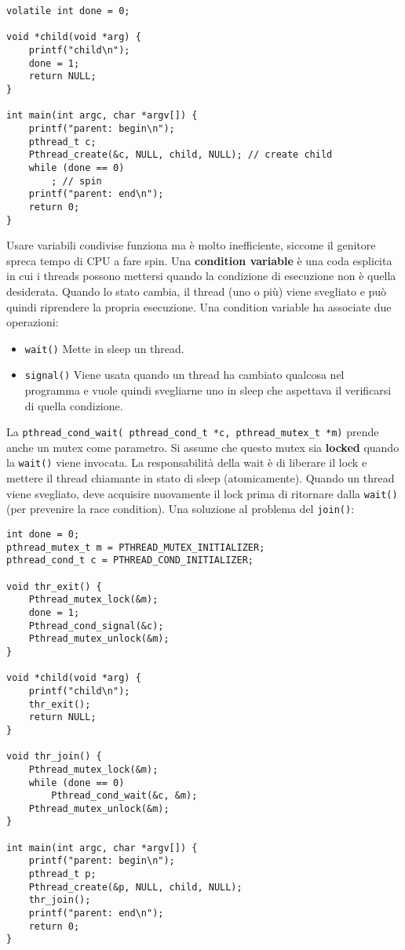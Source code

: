 \documentclass[12pt, letterpaper]{article}
\begin{document}
			\begin{lstlisting}[style=CStyle]
volatile int done = 0;

void *child(void *arg) {
	printf("child\n");
	done = 1;
	return NULL;
}

int main(int argc, char *argv[]) {
	printf("parent: begin\n");
	pthread_t c;
	Pthread_create(&c, NULL, child, NULL); // create child
	while (done == 0)
		; // spin
	printf("parent: end\n");
	return 0;
}			\end{lstlisting}
			Usare variabili condivise funziona ma è molto inefficiente, siccome il genitore spreca tempo di CPU a fare spin. Una \textbf{condition variable} è una coda esplicita in cui i threads possono mettersi quando la condizione di esecuzione non è quella desiderata. Quando lo stato cambia, il thread (uno o più) viene svegliato e può quindi riprendere la propria esecuzione.
			Una condition variable ha associate due operazioni: 
			\begin{itemize}
				\item \texttt{wait()} Mette in sleep un thread.
				\item \texttt{signal()} Viene usata quando un thread ha cambiato qualcosa nel programma e vuole quindi svegliarne uno in sleep che aspettava il verificarsi di quella condizione. 
			\end{itemize}
			La \texttt{pthread\_cond\_wait( pthread\_cond\_t *c, pthread\_mutex\_t *m)} prende anche un mutex come parametro. Si assume che questo mutex sia \textbf{locked} quando la \texttt{wait()} viene invocata. La responsabilità della wait è di liberare il lock e mettere il thread chiamante in stato di sleep (atomicamente). Quando un thread viene svegliato, deve acquisire nuovamente il lock prima di ritornare dalla \texttt{wait()} (per prevenire la race condition). Una soluzione al problema del \texttt{join()}:
			\begin{lstlisting}[style=CStyle]
int done = 0;
pthread_mutex_t m = PTHREAD_MUTEX_INITIALIZER;
pthread_cond_t c = PTHREAD_COND_INITIALIZER;

void thr_exit() {
	Pthread_mutex_lock(&m);
	done = 1;
	Pthread_cond_signal(&c);
	Pthread_mutex_unlock(&m);
}

void *child(void *arg) {
	printf("child\n");
	thr_exit();
	return NULL;
}

void thr_join() {
	Pthread_mutex_lock(&m);
	while (done == 0)
		Pthread_cond_wait(&c, &m);
	Pthread_mutex_unlock(&m);
}

int main(int argc, char *argv[]) {
	printf("parent: begin\n");
	pthread_t p;
	Pthread_create(&p, NULL, child, NULL);
	thr_join();
	printf("parent: end\n");
	return 0;
}			\end{lstlisting}
\end{document}
